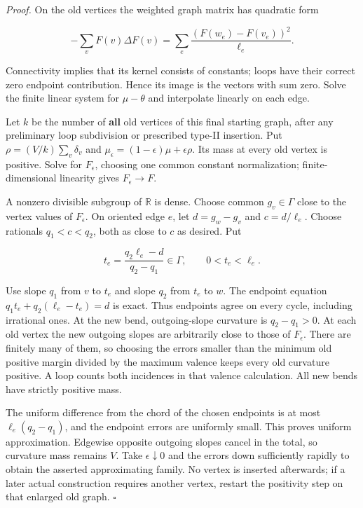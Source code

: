 \documentclass[
  11pt,
]{article}
\begin{document}
\emph{Proof.} On the old vertices the weighted graph matrix has
quadratic form

\[
 -\sum_v F(v)\Delta F(v)=\sum_e\frac{(F(w_e)-F(v_e))^2}{\ell_e}.
\]

Connectivity implies that its kernel consists of constants; loops have
their correct zero endpoint contribution. Hence its image is the vectors
with sum zero. Solve the finite linear system for \(\mu-\theta\) and
interpolate linearly on each edge.

Let \(k\) be the number of \textbf{all} old vertices of this final
starting graph, after any preliminary loop subdivision or prescribed
type-II insertion. Put \(\rho=(V/k)\sum_v\delta_v\) and
\(\mu_\epsilon=(1-\epsilon)\mu+\epsilon\rho\). Its mass at every old
vertex is positive. Solve for \(F_\epsilon\), choosing one common
constant normalization; finite-dimensional linearity gives
\(F_\epsilon\to F\).

A nonzero divisible subgroup of \(\mathbb R\) is dense. Choose common
\(g_v\in\Gamma\) close to the vertex values of \(F_\epsilon\). On
oriented edge \(e\), let \(d=g_w-g_v\) and \(c=d/\ell_e\). Choose
rationals \(q_1<c<q_2\), both as close to \(c\) as desired. Put

\[
t_e=\frac{q_2\ell_e-d}{q_2-q_1}\in\Gamma,\qquad0<t_e<\ell_e.
\]

Use slope \(q_1\) from \(v\) to \(t_e\) and slope \(q_2\) from \(t_e\)
to \(w\). The endpoint equation \(q_1t_e+q_2(\ell_e-t_e)=d\) is exact.
Thus endpoints agree on every cycle, including irrational ones. At the
new bend, outgoing-slope curvature is \(q_2-q_1>0\). At each old vertex
the new outgoing slopes are arbitrarily close to those of
\(F_\epsilon\). There are finitely many of them, so choosing the errors
smaller than the minimum old positive margin divided by the maximum
valence keeps every old curvature positive. A loop counts both
incidences in that valence calculation. All new bends have strictly
positive mass.

The uniform difference from the chord of the chosen endpoints is at most
\(\ell_e(q_2-q_1)\), and the endpoint errors are uniformly small. This
proves uniform approximation. Edgewise opposite outgoing slopes cancel
in the total, so curvature mass remains \(V\). Take
\(\epsilon\downarrow0\) and the errors down sufficiently rapidly to
obtain the asserted approximating family. No vertex is inserted
afterwards; if a later actual construction requires another vertex,
restart the positivity step on that enlarged old graph. \(\square\)
\end{document}
